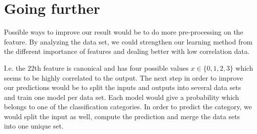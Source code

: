 \documentclass[10pt,conference,compsocconf]{IEEEtran}
\begin{document}
\section{Going further}

Possible ways to improve our result would be to do more pre-processing on the feature. By analyzing the data set, we could strengthen our learning method from the different importance of features and dealing better with low correlation data. 

I.e. the $22$th feature is canonical and has four possible values \(x \in \{0, 1, 2, 3\}\) 
which seems to be highly correlated to the output. The next step in order to improve our predictions would be to split the inputs and outputs into several data sets and train one model per data set. Each model would give a probability which belongs to one of the classification categories. In order to predict the category, we would split the input as well, compute the prediction and merge the data sets into one unique set. 
\end{document}
